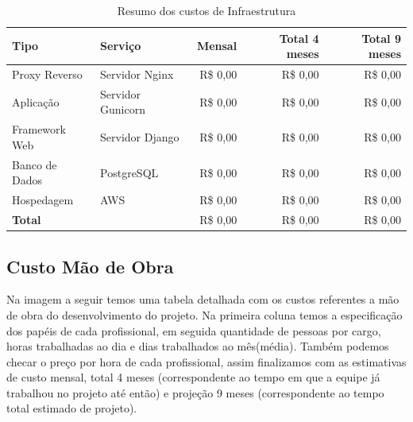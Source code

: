 \documentclass[
	12pt,				%
	openany,			%
	twoside,			%
	a4paper,			%
	english,			%
	french,				%
	spanish,			%
	brazil				%
	]{abntex2}
\begin{document}
\begin{table}[H]
	\centering
	\caption{Resumo dos custos de Infraestrutura}
	\label{tab:infraestrutura}
	\begin{tabular}{|l|l|r|r|r|}
		\hline
		\textbf{Tipo} & \textbf{Serviço} & \textbf{Mensal} & \textbf{Total 4 meses} & \textbf{Total 9 meses} \\
		\hline
		Proxy Reverso & Servidor Nginx & R\$ 0,00 & R\$ 0,00 & R\$ 0,00 \\
		\hline
		Aplicação & Servidor Gunicorn & R\$ 0,00 & R\$ 0,00 & R\$ 0,00 \\
		\hline
		Framework Web & Servidor Django & R\$ 0,00 & R\$ 0,00 & R\$ 0,00 \\
		\hline
		Banco de Dados & PostgreSQL & R\$ 0,00 & R\$ 0,00 & R\$ 0,00 \\
		\hline
		Hospedagem & AWS & R\$ 0,00 & R\$ 0,00 & R\$ 0,00 \\
		\hline
		\textbf{Total} & & R\$ 0,00 & R\$ 0,00 & R\$ 0,00 \\
		\hline
	\end{tabular}
\end{table}

\subsection{Custo Mão de Obra}

Na imagem a seguir temos uma tabela detalhada com os custos referentes a mão de obra do desenvolvimento do projeto. 
Na primeira coluna temos a especificação dos papéis de cada profissional, em seguida quantidade de pessoas por cargo, horas trabalhadas ao dia e dias trabalhados ao mês(média).
Também podemos checar o preço por hora de cada profissional, assim finalizamos com as estimativas de custo mensal, total 4 meses (correspondente ao tempo em que a equipe já trabalhou no projeto até então) e projeção 9 meses (correspondente ao tempo total estimado de projeto).
\end{document}
